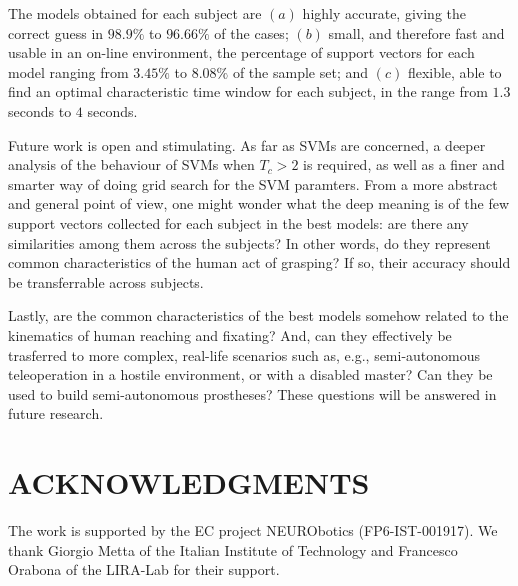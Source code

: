 \documentclass[a4paper,10pt,conference]{ieeeconf}
\begin{document}
The models obtained for each subject are $(a)$ highly accurate, giving
the correct guess in $98.9\%$ to $96.66\%$ of the cases; $(b)$ small,
and therefore fast and usable in an on-line environment, the
percentage of support vectors for each model ranging from $3.45\%$ to
$8.08\%$ of the sample set; and $(c)$ flexible, able to find an
optimal characteristic time window for each subject, in the range from
$1.3$ seconds to $4$ seconds.

Future work is open and stimulating. As far as SVMs are concerned, a
deeper analysis of the behaviour of SVMs when $T_c>2$ is required, as
well as a finer and smarter way of doing grid search for the SVM
paramters. From a more abstract and general point of view, one might
wonder what the deep meaning is of the few support vectors collected
for each subject in the best models: are there any similarities among
them across the subjects? In other words, do they represent common
characteristics of the human act of grasping? If so, their accuracy
should be transferrable across subjects.

Lastly, are the common characteristics of the best models somehow
related to the kinematics of human reaching and fixating? And, can
they effectively be trasferred to more complex, real-life scenarios
such as, e.g., semi-autonomous teleoperation in a hostile environment,
or with a disabled master? Can they be used to build semi-autonomous
prostheses? These questions will be answered in future research.

\section*{ACKNOWLEDGMENTS}

The work is supported by the EC project NEURObotics
(FP6-IST-001917). We thank Giorgio Metta of the Italian Institute of
Technology and Francesco Orabona of the LIRA-Lab for their support.


{\small


}
\end{document}
